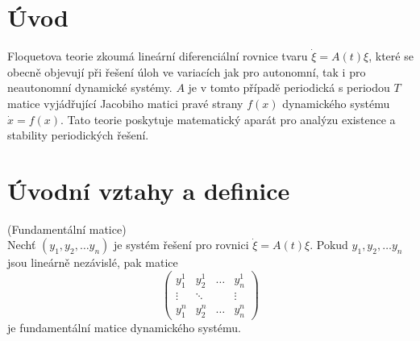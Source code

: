 \section{Úvod}\label{sec:uvod}

Floquetova teorie zkoumá lineární diferenciální rovnice tvaru  $\dot{\xi } = A(t) \xi$, které se obecně objevují při řešení úloh ve variacích jak pro autonomní, tak i pro neautonomní dynamické systémy. $A$ je v tomto případě periodická s periodou $T$ matice vyjádřující Jacobiho matici pravé strany $f(x)$ dynamického systému $\dot{x} = f(x)$.  Tato teorie poskytuje matematický aparát pro analýzu existence a stability periodických řešení.

\section{Úvodní vztahy a definice}\label{sec:uvodni_vztahy}

\begin{defn} (Fundamentální matice) \\
	Nechť $(y_{1}, y_{2}, \dots y_{n})$ je systém řešení pro rovnici $\dot{\xi } = A(t) \xi$. Pokud $y_{1}, y_{2}, \dots y_{n}$ jsou lineárně nezávislé, pak matice 
	\begin{equation}
		\begin{pmatrix} 
			y_{1}^{1} & y_{2}^{1} & \dots & y_{n}^{1} \\ 
			\vdots & \ddots & & \vdots \\ 
			y_{1}^{n} & y_{2}^{n} & \dots & y_{n}^{n} 
		\end{pmatrix} 
	\end{equation}
	je fundamentální matice dynamického systému.
\end{defn}

